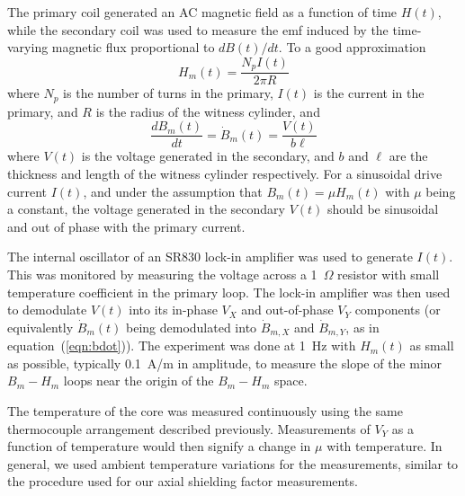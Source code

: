 


The primary coil generated an AC magnetic field as a function of time
$H(t)$, while the secondary coil was used to measure the emf induced
by the time-varying magnetic flux proportional to $dB(t)/dt$.  To a
good approximation
\begin{equation}
H_m(t)=\frac{N_pI(t)}{2\pi R}
\end{equation}
where $N_p$ is the number of turns in the primary, $I(t)$ is the
current in the primary, and $R$ is the radius of the witness cylinder,
and
\begin{equation}
\frac{dB_m(t)}{dt}=\dot{B}_m(t)=\frac{V(t)}{b\ell}
\label{eqn:bdot}
\end{equation}
where $V(t)$ is the voltage generated in the secondary, and $b$ and
$\ell$ are the thickness and length of the witness cylinder
respectively.  For a sinusoidal drive current $I(t)$, and under the
assumption that $B_m(t)=\mu H_m(t)$ with $\mu$ being a constant, the
voltage generated in the secondary $V(t)$ should be sinusoidal and out
of phase with the primary current.

The internal oscillator of an SR830 lock-in amplifier was used to
generate $I(t)$.  This was monitored by measuring the voltage across a
1~$\Omega$ resistor with small temperature coefficient in the primary
loop.  The lock-in amplifier was then used to demodulate $V(t)$ into
its in-phase $V_X$ and out-of-phase $V_Y$ components (or equivalently
$\dot{B}_m(t)$ being demodulated into $\dot{B}_{m,X}$ and
$\dot{B}_{m,Y}$, as in equation~(\ref{eqn:bdot})).  The experiment was
done at 1~Hz with $H_m(t)$ as small as possible, typically 0.1~A/m in
amplitude, to measure the slope of the minor $B_m-H_m$ loops near the
origin of the $B_m-H_m$ space.

The temperature of the core was measured continuously using the same
thermocouple arrangement described previously.  Measurements of $V_Y$
as a function of temperature would then signify a change in $\mu$ with
temperature.  In general, we used ambient temperature variations for
the measurements, similar to the procedure used for our axial
shielding factor measurements.


